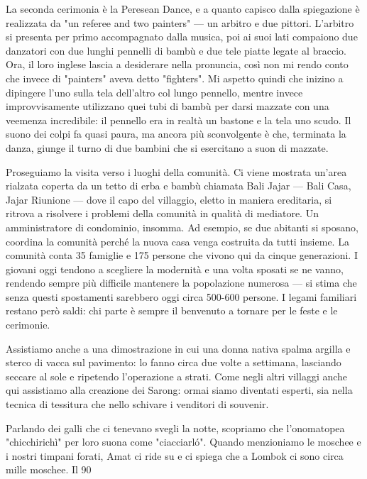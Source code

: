 La seconda cerimonia è la Peresean Dance, e a quanto capisco dalla spiegazione è realizzata da "un referee and two painters" — un arbitro e due pittori. L'arbitro si presenta per primo accompagnato dalla musica, poi ai suoi lati compaiono due danzatori con due lunghi pennelli di bambù e due tele piatte legate al braccio. Ora, il loro inglese lascia a desiderare nella pronuncia, così non mi rendo conto che invece di "painters" aveva detto "fighters". Mi aspetto quindi che inizino a dipingere l'uno sulla tela dell'altro col lungo pennello, mentre invece improvvisamente utilizzano quei tubi di bambù per darsi mazzate con una veemenza incredibile: il pennello era in realtà un bastone e la tela uno scudo. Il suono dei colpi fa quasi paura, ma ancora più sconvolgente è che, terminata la danza, giunge il turno di due bambini che si esercitano a suon di mazzate.

Proseguiamo la visita verso i luoghi della comunità. Ci viene mostrata un'area rialzata coperta da un tetto di erba e bambù chiamata Bali Jajar — Bali Casa, Jajar Riunione — dove il capo del villaggio, eletto in maniera ereditaria, si ritrova a risolvere i problemi della comunità in qualità di mediatore. Un amministratore di condominio, insomma. Ad esempio, se due abitanti si sposano, coordina la comunità perché la nuova casa venga costruita da tutti insieme. La comunità conta 35 famiglie e 175 persone che vivono qui da cinque generazioni. I giovani oggi tendono a scegliere la modernità e una volta sposati se ne vanno, rendendo sempre più difficile mantenere la popolazione numerosa — si stima che senza questi spostamenti sarebbero oggi circa 500-600 persone. I legami familiari restano però saldi: chi parte è sempre il benvenuto a tornare per le feste e le cerimonie.

Assistiamo anche a una dimostrazione in cui una donna nativa spalma argilla e sterco di vacca sul pavimento: lo fanno circa due volte a settimana, lasciando seccare al sole e ripetendo l'operazione a strati. Come negli altri villaggi anche qui assistiamo alla creazione dei Sarong: ormai siamo diventati esperti, sia nella tecnica di tessitura che nello schivare i venditori di souvenir.

Parlando dei galli che ci tenevano svegli la notte, scopriamo che l'onomatopea "chicchirichì" per loro suona come "ciacciarló". Quando menzioniamo le moschee e i nostri timpani forati, Amat ci ride su e ci spiega che a Lombok ci sono circa mille moschee. Il 90%

